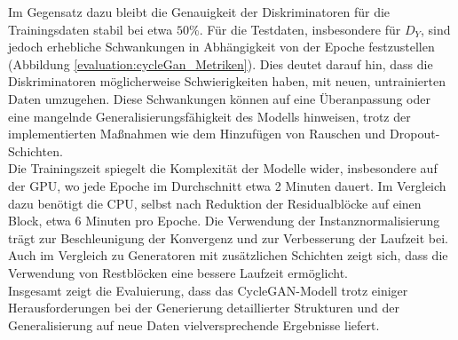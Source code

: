 Im Gegensatz dazu bleibt die Genauigkeit der Diskriminatoren für die Trainingsdaten stabil bei etwa $50\%$. Für die Testdaten, insbesondere für $D_Y$, sind jedoch erhebliche Schwankungen in Abhängigkeit von der Epoche festzustellen  (Abbildung \ref{evaluation:cycleGan_Metriken}). Dies deutet darauf hin, dass die Diskriminatoren möglicherweise Schwierigkeiten haben, mit neuen, untrainierten Daten umzugehen. Diese Schwankungen können auf eine Überanpassung oder eine mangelnde Generalisierungsfähigkeit des Modells hinweisen, trotz der implementierten Maßnahmen wie dem Hinzufügen von Rauschen und Dropout-Schichten.\\\newline
Die Trainingszeit spiegelt die Komplexität der Modelle wider, insbesondere auf der GPU, wo jede Epoche im Durchschnitt etwa 2 Minuten dauert. Im Vergleich dazu benötigt die CPU, selbst nach Reduktion der Residualblöcke auf einen Block, etwa 6 Minuten pro Epoche. Die Verwendung der Instanznormalisierung trägt zur Beschleunigung der Konvergenz und zur Verbesserung der Laufzeit bei. Auch im Vergleich zu Generatoren mit zusätzlichen Schichten zeigt sich, dass die Verwendung von Restblöcken eine bessere Laufzeit ermöglicht. 
\\\newline
Insgesamt zeigt die Evaluierung, dass das CycleGAN-Modell trotz einiger Herausforderungen bei der Generierung detaillierter Strukturen und der Generalisierung auf neue Daten vielversprechende Ergebnisse liefert.